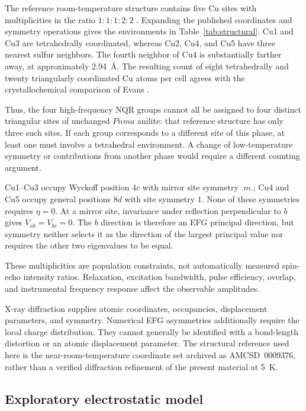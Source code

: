 The reference room-temperature structure contains five Cu sites with multiplicities in the ratio $1:1:1:2:2$ \citep{Koto1970}. Expanding the published coordinates and symmetry operations gives the environments in Table~\ref{tab:structural}. Cu1 and Cu3 are tetrahedrally coordinated, whereas Cu2, Cu4, and Cu5 have three nearest sulfur neighbors. The fourth neighbor of Cu4 is substantially farther away, at approximately 2.94~\AA. The resulting count of eight tetrahedrally and twenty triangularly coordinated Cu atoms per cell agrees with the crystallochemical comparison of Evans \citep{Evans1981}.

Thus, the four high-frequency NQR groups cannot all be assigned to four distinct triangular sites of unchanged $Pnma$ anilite: that reference structure has only three such sites. If each group corresponds to a different site of this phase, at least one must involve a tetrahedral environment. A change of low-temperature symmetry or contributions from another phase would require a different counting argument.

Cu1--Cu3 occupy Wyckoff position $4c$ with mirror site symmetry $.m.$; Cu4 and Cu5 occupy general positions $8d$ with site symmetry $1$. None of these symmetries requires $\eta=0$. At a mirror site, invariance under reflection perpendicular to $b$ gives $V_{ab}=V_{bc}=0$. The $b$ direction is therefore an EFG principal direction, but symmetry neither selects it as the direction of the largest principal value nor requires the other two eigenvalues to be equal.

These multiplicities are population constraints, not automatically measured spin-echo intensity ratios. Relaxation, excitation bandwidth, pulse efficiency, overlap, and instrumental frequency response affect the observable amplitudes.

X-ray diffraction supplies atomic coordinates, occupancies, displacement parameters, and symmetry. Numerical EFG asymmetries additionally require the local charge distribution. They cannot generally be identified with a bond-length distortion or an atomic displacement parameter. The structural reference used here is the near-room-temperature coordinate set archived as AMCSD~0009376, rather than a verified diffraction refinement of the present material at 5~K.

\subsection{Exploratory electrostatic model}

